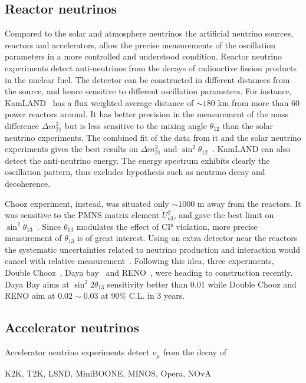 \subsection{Reactor neutrinos}
\label{sec:reactor}
Compared to the solar and atmosphere neutrinos the artificial neutrino sources, reactors and accelerators, allow the precise measurements of the oscillation parameters in a more controlled and understood condition. Reactor neutrino experiments detect anti-neutrinos from the decays of radioactive fission products in the nuclear fuel. The detector can be constructed in different distances from the source, and hence sensitive to different oscillation parameters. For instance, KamLAND~\cite{Kam03} has a flux weighted average distance of $\sim180$ km from more than 60 power reactors around. It has better precision in the measurement of the mass difference $\Delta m^{2}_{21}$ but is less sensitive to the mixing angle $\theta_{12}$ than the solar neutrino experiments. The combined fit of the data from it and the solar neutrino experiments gives the best results on $\Delta m^{2}_{21}$ and $\sin^{2}\theta_{12}$~\cite{Kam08}. KamLAND can also detect the anti-neutrino energy. The energy spectrum exhibits clearly the oscillation pattern, thus excludes hypothesis such as neutrino decay and decoherence.

Chooz experiment, instead, was situated only $\sim1000$ m away from the reactors. It was sensitive to the PMNS matrix element $U_{e3}^{2}$, and gave the best limit on $\sin^{2}\theta_{13}$~\cite{Cho03}. Since $\theta_{13}$ modulates the effect of CP violation, more precise measurement of $\theta_{13}$ is of great interest. Using an extra detector near the reactors the systematic uncertainties related to neutrino production and interaction would cancel with relative measurement~\cite{Koz03}. Following this idea, three experiments, Double Chooz~\cite{Dbc06}, Daya bay~\cite{Day07} and RENO~\cite{Ren08}, were heading to construction recently. Daya Bay aims at $\sin^{2}2\theta_{13}$ sensitivity better than 0.01 while Double Chooz and RENO aim at $0.02 \sim 0.03$ at $90\%$ C.L. in 3 years.

\subsection{Accelerator  neutrinos}
\label{sec:acce}
Accelerator neutrino experiments detect $\nu_{\mu}$ from the decay of 

K2K, T2K, LSND, MiniBOONE, MINOS, Opera, NOvA



